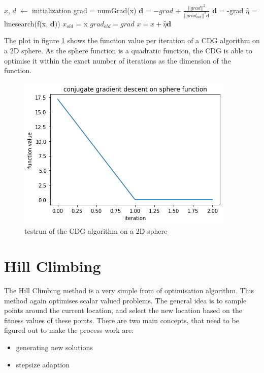 \documentclass[./\jobname.tex]{subfiles}
\begin{document}
\begin{algorithm}
	\SetAlgoNoLine
	\DontPrintSemicolon
	$x$, $d$ $\gets$ initialization\;
	{
		grad = numGrad(x)\;
		$\textbf{d}$ = $-grad$ + $\frac{||grad||^2}{||grad_{old}||^2 \textbf{d}}$\;
		{
			$\textbf{d}$ = -grad\;
		}
		$\hat{\eta}$ = linesearch(f(x, $\textbf{d}$))\;
		$x_{old}$ = x\;
		$grad_{old} = grad$\;
		$x = x + \hat{\eta} \textbf{d}$\;
	}
	\label{algo: CGD}
\end{algorithm}


The plot in figure \ref{fig:CDG_verification} shows the function value per iteration of a CDG algorithm on a 2D sphere. As the sphere function is a quadratic function, the CDG is able to optimise it within the exact number of iterations as the dimension of the function. 


\begin{figure}[H]
	\centering
	\includegraphics[width=0.9\linewidth]{../img/png/conjugate_gradient_descent_verification.png}
	\caption{testrun of the CDG algorithm on a 2D sphere}
	\label{fig:CDG_verification}
\end{figure}



\section{Hill Climbing}

The Hill Climbing method is a very simple from of optimisation algorithm. This method again optimises scalar valued problems. The general idea is to sample points around the current location, and select the new location based on the fitness values of these points. There are two main concepts, that need to be figured out to make the process work are: 
\begin{itemize}
	\item generating new solutions 
	\item stepsize adaption\\
\end{itemize}
\end{document}
